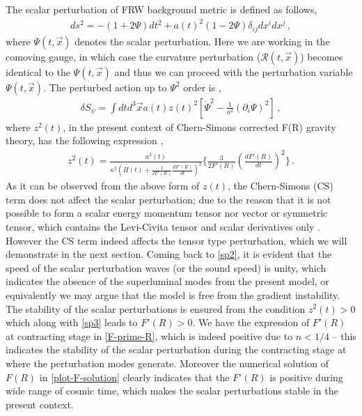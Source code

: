 \documentclass{article}
\begin{document}
The scalar perturbation of FRW background metric is defined as
follows,
\begin{align}
ds^2 = -(1 + 2\Psi)dt^2 + a(t)^2(1 - 2\Psi)\delta_{ij}dx^{i}dx^{j}\, ,
\label{sp1}
\end{align}
where $\Psi(t,\vec{x})$ denotes the scalar perturbation. Here we are working in the comoving gauge, in which case 
the curvature perturbation ($\mathcal{R}(t,\vec{x})$) becomes identical to the $\Psi(t,\vec{x})$ and thus we can proceed with the perturbation 
variable $\Psi(t,\vec{x})$. The perturbed action up to $\Psi^2$ order is \cite{Hwang:2005hb,Noh:2001ia,Hwang:2002fp},
\begin{align}
\delta S_{\psi} = \int dt d^3\vec{x} a(t) z(t)^2\left[\dot{\Psi}^2
 - \frac{1}{a^2}\left(\partial_i\Psi\right)^2\right]\, ,
\label{sp2}
\end{align}
where $z^2(t)$, in the present context of Chern-Simons corrected F(R) gravity theory, has the following expression \cite{Hwang:2005hb},
\begin{align}
z^2(t) = \frac{a^2(t)}{\kappa^2\left(H(t) + \frac{1}{2F'(R)}\frac{dF'(R)}{dt}\right)^2} \bigg\{\frac{3}{2F'(R)}\left(\frac{dF'(R)}{dt}\right)^2\bigg\}\, .
\label{sp3}
\end{align}
As it can be observed from the above form of $z(t)$, the Chern-Simons (CS) term does not affect the scalar perturbation; 
due to the reason that it is not possible to form a scalar energy momentum tensor nor vector or symmetric tensor, which contains 
the Levi-Civita tensor and scalar derivatives only \cite{Hwang:2005hb}. However the CS term indeed affects the tensor type perturbation, which we will 
demonstrate in the next section. Coming back to \ref{sp2}, it is evident 
that the speed of the scalar perturbation waves (or the sound speed) is unity, which indicates the 
absence of the superluminal modes from the present model, or equivalently we may argue that the model is free from the gradient 
instability. The stability of the scalar perturbations is ensured from the condition $z^2(t) > 0$ which along with \ref{sp3} leads to 
$F'(R) > 0$. We have the expression of $F'(R)$ at contracting stage in \ref{F-prime-R}, 
which is indeed positive due to $n < 1/4$ -- this indicates the stability of the scalar perturbation during 
the contracting stage at where the perturbation modes generate. Moreover the numerical solution of $F(R)$ in \ref{plot-F-solution} clearly indicates that 
the $F'(R)$ is positive during wide range of cosmic time, which makes the scalar perturbations stable in the present context.
\end{document}
